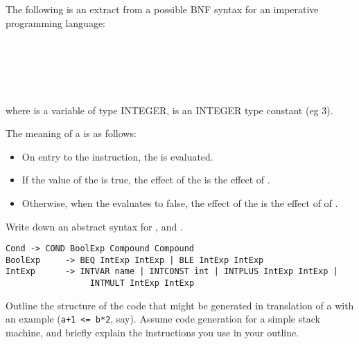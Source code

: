 \begin{questions}

\question

\begin{subquestions}

\subquestion
The following is an extract from a possible BNF syntax for
an imperative programming language: 
\begin{bnf}
 \\
 \\
\\
\\
\end{bnf}
where  is a variable of type INTEGER, 
is an INTEGER type constant (eg 3).

The meaning of a  is as follows:
\begin{itemize}
\item On entry to the instruction, the  is 
        evaluated. 
\item If the value of the  is true, the effect of
        the  is the effect of .
\item Otherwise, when the  evaluates to false,
        the effect of the  is the effect of
        of .
\end{itemize}

\begin{subsubquestions}
\subsubquestion
Write down an abstract syntax for , 
 and .
\begin{modelanswer}
\begin{verbatim}
Cond -> COND BoolExp Compound Compound
BoolExp     -> BEQ IntExp IntExp | BLE IntExp IntExp
IntExp      -> INTVAR name | INTCONST int | INTPLUS IntExp IntExp |
                 INTMULT IntExp IntExp
\end{verbatim}
\end{modelanswer}
\subsubquestion
        Outline the structure of the
        code that might be generated in translation of
        a  with an example 
         (\verb"a+1 <= b*2", say). 
        Assume code generation for a simple
        stack machine, and briefly explain the
        instructions you use in your outline.


\end{subsubquestions}
\end{subquestions}
\end{questions}
